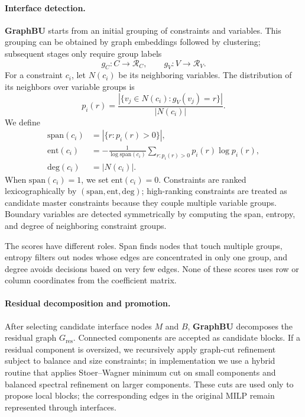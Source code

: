 \documentclass[letterpaper]{article}
\newcommand{\method}{\textbf{GraphBU}\xspace}
\begin{document}
\paragraph{Interface detection.}
\method starts from an initial grouping of constraints and variables. This grouping can be obtained by graph embeddings followed by clustering; subsequent stages only require group labels
\begin{equation}
g_C:C\rightarrow \mathcal{R}_C,
\qquad
g_V:V\rightarrow \mathcal{R}_V .
\end{equation}
For a constraint $c_i$, let $N(c_i)$ be its neighboring variables. The distribution of its neighbors over variable groups is
\begin{equation}
p_i(r)=
\frac{
|\{v_j\in N(c_i): g_V(v_j)=r\}|
}{
|N(c_i)|
}.
\end{equation}
We define
\begin{align}
\mathrm{span}(c_i) &= |\{r:p_i(r)>0\}|,\\
\mathrm{ent}(c_i) &=
-\frac{1}{\log \mathrm{span}(c_i)}
\sum_{r:p_i(r)>0}p_i(r)\log p_i(r),\\
\mathrm{deg}(c_i) &= |N(c_i)|.
\end{align}
When $\mathrm{span}(c_i)=1$, we set $\mathrm{ent}(c_i)=0$. Constraints are ranked lexicographically by $(\mathrm{span},\mathrm{ent},\mathrm{deg})$; high-ranking constraints are treated as candidate master constraints because they couple multiple variable groups. Boundary variables are detected symmetrically by computing the span, entropy, and degree of neighboring constraint groups.

The scores have different roles. Span finds nodes that touch multiple groups, entropy filters out nodes whose edges are concentrated in only one group, and degree avoids decisions based on very few edges. None of these scores uses row or column coordinates from the coefficient matrix.

\paragraph{Residual decomposition and promotion.}
After selecting candidate interface nodes $M$ and $B$, \method decomposes the residual graph $G_{\mathrm{res}}$. Connected components are accepted as candidate blocks. If a residual component is oversized, we recursively apply graph-cut refinement subject to balance and size constraints; in implementation we use a hybrid routine that applies Stoer--Wagner minimum cut on small components and balanced spectral refinement on larger components. These cuts are used only to propose local blocks; the corresponding edges in the original MILP remain represented through interfaces.
\end{document}
